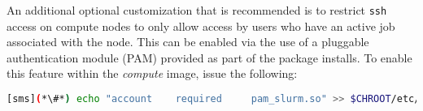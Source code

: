 An additional optional customization that is recommended is to
restrict \texttt{ssh} access on compute nodes to only allow access by users who
have an active job associated with the node. This can be enabled via the use of
a pluggable authentication module (PAM) provided as part of the \SLURM{} package
installs. To enable this feature within the {\em compute} image, issue the
following:

\begin{lstlisting}[language=bash,keywords={},upquote=true]
[sms](*\#*) echo "account    required     pam_slurm.so" >> $CHROOT/etc/pam.d/sshd
\end{lstlisting}


